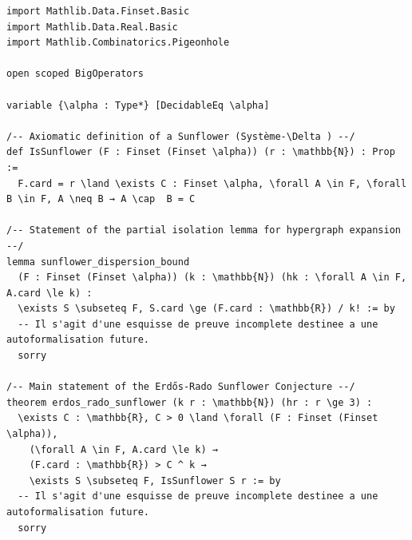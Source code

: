 \documentclass[12pt,a4paper]{article}
\begin{document}
\begin{verbatim}
import Mathlib.Data.Finset.Basic
import Mathlib.Data.Real.Basic
import Mathlib.Combinatorics.Pigeonhole

open scoped BigOperators

variable {\alpha : Type*} [DecidableEq \alpha]

/-- Axiomatic definition of a Sunflower (Système-\Delta ) --/
def IsSunflower (F : Finset (Finset \alpha)) (r : \mathbb{N}) : Prop :=
  F.card = r \land \exists C : Finset \alpha, \forall A \in F, \forall B \in F, A \neq B → A \cap  B = C

/-- Statement of the partial isolation lemma for hypergraph expansion --/
lemma sunflower_dispersion_bound
  (F : Finset (Finset \alpha)) (k : \mathbb{N}) (hk : \forall A \in F, A.card \le k) :
  \exists S \subseteq F, S.card \ge (F.card : \mathbb{R}) / k! := by
  -- Il s'agit d'une esquisse de preuve incomplete destinee a une autoformalisation future.
  sorry

/-- Main statement of the Erdős-Rado Sunflower Conjecture --/
theorem erdos_rado_sunflower (k r : \mathbb{N}) (hr : r \ge 3) :
  \exists C : \mathbb{R}, C > 0 \land \forall (F : Finset (Finset \alpha)),
    (\forall A \in F, A.card \le k) →
    (F.card : \mathbb{R}) > C ^ k →
    \exists S \subseteq F, IsSunflower S r := by
  -- Il s'agit d'une esquisse de preuve incomplete destinee a une autoformalisation future.
  sorry
\end{verbatim}
\end{document}
